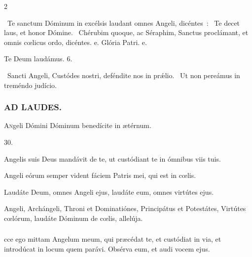 \documentclass[9pt,twoside]{extarticle}
\begin{document}
\begin{multicols}{2}
{\begin{tightlist}{}
\item {}~Te sanctum Dóminum in excélsis laudant omnes Angeli, dicéntes~: \textred{*}~Te decet laus, et honor Dómine. ~Chérubim quoque, ac Séraphim, Sanctus proclámant, et omnis cœlicus ordo, dicéntes. e. Glória Patri. e.
\item Te Deum laudámus. 6.
\item {}~Sancti Angeli, Custódes nostri, deféndite nos in prǽlio. ~Ut non pereámus in treméndo judício.
\end{tightlist}

\subsubsection*{\center \textsc{AD LAUDES.}}
\begin{center}\end{center}
\lettrine{A}ngeli Dómini Dóminum benedícite in ætérnum.

\begin{tightlist}{}
\item {} 30.
\item {} Angelis suis Deus mandávit de te, ut custódiant te in ómnibus viis tuis.
\item {} Angeli eórum semper vident fáciem Patris mei, qui est in cœlis.
\item {} Laudáte Deum, omnes Angeli ejus, laudáte eum, omnes virtútes ejus.
\item {} Angeli, Archángeli, Throni et Dominatiónes, Principátus et Potestátes, Virtútes cœlórum, laudáte Dóminum de cœlis, allelúja.
\end{tightlist}

\subsubsection*{}
cce ego mittam Angelum meum, qui præcédat te, et custódiat in via, et introdúcat in locum quem parávi. Obsérva eum, et audi vocem ejus.

}
\end{multicols}
\end{document}
